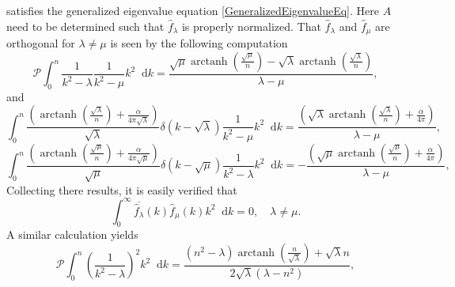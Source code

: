 \documentclass[a4paper,11pt]{article}
\DeclareMathOperator\arctanh{arctanh}
\newcommand*\diff{\mathop{}\!\mathrm{d}}
\numberwithin{equation}{section}
\begin{document}
	satisfies the generalized eigenvalue equation \eqref{GeneralizedEigenvalueEq}.
	Here $ A $ need to be determined such that $ \hat{f}_\lambda $ is properly normalized. That $ \hat{f}_\lambda $ and $ \hat{f}_{\mu} $ are orthogonal for $ \lambda\neq\mu $ is seen by the following computation\begin{equation}
	\mathcal{P}\int_{0}^{n}\frac{1}{k^2-\lambda}\frac{1}{k^2-\mu}k^2\diff k=\frac{\sqrt{\mu } \arctanh\left(\frac{\sqrt{\mu }}{n}\right)-\sqrt{\lambda }
		\arctanh\left(\frac{\sqrt{\lambda }}{n}\right)}{\lambda -\mu },
	\end{equation}
	and \begin{equation}
	\int_{0}^{n}\frac{\left(\arctanh\left(\frac{\sqrt{\lambda}}{n}\right)+\frac{\alpha}{4\pi\sqrt{\lambda}}\right)}{\sqrt{\lambda}}\delta(k-\sqrt{\lambda})\frac{1}{k^2-\mu}k^2\diff k=\frac{\left(\sqrt{\lambda}\arctanh\left(\frac{\sqrt{\lambda}}{n}\right)+\frac{\alpha}{4\pi}\right)}{\lambda-\mu},
	\end{equation}
	\begin{equation}
	\int_{0}^{n}\frac{\left(\arctanh\left(\frac{\sqrt{\mu}}{n}\right)+\frac{\alpha}{4\pi\sqrt{\mu}}\right)}{\sqrt{\mu}}\delta(k-\sqrt{\mu})\frac{1}{k^2-\lambda}k^2\diff k=-\frac{\left(\sqrt{\mu}\arctanh\left(\frac{\sqrt{\mu}}{n}\right)+\frac{\alpha}{4\pi}\right)}{\lambda-\mu},
	\end{equation}
	Collecting there results, it is easily verified that \begin{equation}
	\int_{0}^{\infty}\overline{\hat{f}_\lambda}(k)\hat{f}_\mu(k)k^2\diff k=0,\quad \lambda\neq\mu.
	\end{equation}
	A similar calculation yields
	\begin{equation}
	\mathcal{P}\int_{0}^{n}\left(\frac{1}{k^2-\lambda}\right)^2k^2\diff k=\frac{\left(n^2-\lambda \right) \arctanh\left(\frac{n}{\sqrt{\lambda
			}}\right)+\sqrt{\lambda } n}{2 \sqrt{\lambda } \left(\lambda -n^2\right)},
	\end{equation}
\end{document}
